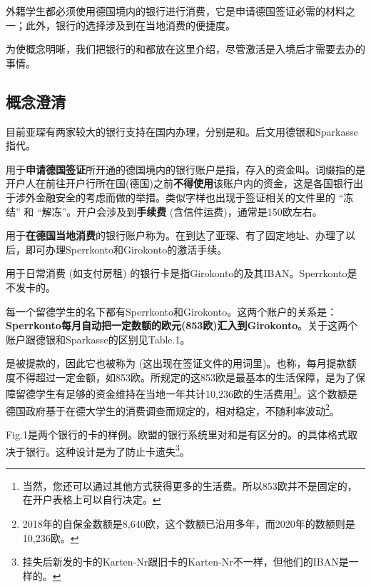   外籍学生都必须使用德国境内的银行进行消费，它是申请德国签证必需的材料之一；此外，银行的选择涉及到在当地消费的便捷度。

  为使概念明晰，我们把银行的和都放在这里介绍，尽管激活是入境后才需要去办的事情。

  \subsection{概念澄清}
 
    目前亚琛有两家较大的银行支持在国内办理，分别是\href{https://www.deutsche-bank.de/pk.html}{}和\href{https://www.sparkasse-aachen.de/de/home.html}{}。后文用德银和Sparkasse指代。

    用于\textbf{申请德国签证}所开通的德国境内的银行账户是指，存入的资金叫。词缀指的是开户人在前往开户行所在国(德国)之前\textbf{不得使用}该账户内的资金，这是各国银行出于涉外金融安全的考虑而做的举措。类似字样也出现于签证相关的文件里的 “冻结” 和 “解冻”。开户会涉及到\textbf{手续费} (含信件运费)，通常是150欧左右。

    用于\textbf{在德国当地消费}的银行账户称为。在到达了亚琛、有了固定地址、办理了以后，即可办理Sperrkonto和Girokonto的激活手续。

    用于日常消费 (如支付房租) 的银行卡是指Girokonto的及其IBAN。Sperrkonto是不发卡的。

    每一个留德学生的名下都有Sperrkonto和Girokonto。这两个账户的关系是：\textbf{Sperrkonto每月自动把一定数额的欧元(853欧)汇入到Girokonto}。关于这两个账户跟德银和Sparkasse的区别见Table.1。

    是被提款的，因此它也被称为 (这出现在签证文件的用词里)。也称，每月提款额度不得超过一定金额，如853欧。所规定的这853欧是最基本的生活保障，是为了保障留德学生有足够的资金维持在当地一年共计10,236欧的生活费用\footnote{当然，您还可以通过其他方式获得更多的生活费。所以853欧并不是固定的，在开户表格上可以自行决定。}。这个数额是德国政府基于在德大学生的消费调查而规定的，相对稳定，不随利率波动\footnote{2018年的自保金数额是8,640欧，这个数额已沿用多年，而2020年的数额则是10,236欧。}。

    Fig.1是两个银行的卡的样例。欧盟的银行系统里对和是有区分的。的具体格式取决于银行。这种设计是为了防止卡遗失\footnote{挂失后新发的卡的Karten-Nr跟旧卡的Karten-Nr不一样，但他们的IBAN是一样的。}。

